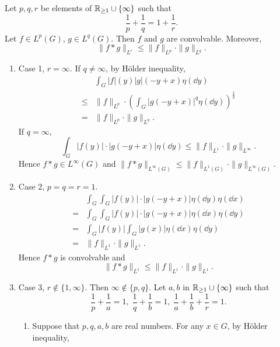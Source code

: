 \begin{theoremenv}
    Let $p,q,r$ be elements of $\mathbb{R}_{\ge 1} \cup \{\infty\}$ such that
    $$\frac{1}{p} + \frac{1}{q} = 1 + \frac{1}{r}.$$
    Let $f \in L^p(G)$, $g \in L^q(G)$.
    Then $f$ and $g$ are convolvable.
    Moreover,
    $$\|f * g\|_{L^r} \le \|f\|_{L^p} \cdot \|g\|_{L^q}.$$
\end{theoremenv}
\begin{proofenv}
    \quad
    \begin{enumerate}
        \item Case 1, $r = \infty$. If $q \neq \infty$, by Hölder inequality,
            $$\begin{aligned}
                & \int_{G} |f|(y) |g|(-y+x) \eta(\dd y)\\
                \le & \|f\|_{L^p} \cdot \left(\int_{G} |g(-y+x)|^q \eta(\dd y)\right)^{\frac{1}{q}}\\
                = & \|f\|_{L^p} \cdot \|g\|_{L^q}.
            \end{aligned}$$
            If $q = \infty$,
            $$\int_{G} |f(y)|\cdot|g(-y+x)| \eta(\dd y) \le \|f\|_{L^1} \cdot \|g\|_{L^\infty}.$$
            Hence $f*g \in L^\infty(G)$ and $\|f*g\|_{L^\infty(G)} \le \|f\|_{L^1(G)} \cdot \|g\|_{L^\infty(G)}.$
        \item Case 2, $p=q=r=1$.
            $$\begin{aligned}
                & \int_{G} \int_{G} |f(y)|\cdot|g(-y+x)| \eta(\dd y) \eta(\dd x)\\
                = & \int_{G} \int_{G} |f(y)|\cdot|g(-y+x)| \eta(\dd x) \eta(\dd y)\\
                = & \int_{G} |f(y)| \int_{G} |g(x)| \eta(\dd x) \eta(\dd y)\\
                = & \|f\|_{L^1} \cdot \|g\|_{L^1}.
            \end{aligned}$$
            Hence $f*g$ is convolvable and
            $$\|f * g\|_{L^1} \le \|f\|_{L^1} \cdot \|g\|_{L^1}.$$
        \item Case 3, $r \notin \{1, \infty\}$.
            Then $\infty \notin \{p,q\}$.
            Let $a,b$ in $\mathbb{R}_{\ge 1} \cup \{\infty\}$ such that
            $$\frac{1}{p} + \frac{1}{a} = 1,\; \frac{1}{q} + \frac{1}{b} = 1, \; \frac{1}{a} + \frac{1}{b} + \frac{1}{r} = 1.$$
            \begin{enumerate}
                \item Suppose that $p,q,a,b$ are real numbers.
                    For any $x \in G$, by Hölder inequality,

\end{enumerate}
\end{enumerate}
\end{proofenv}
